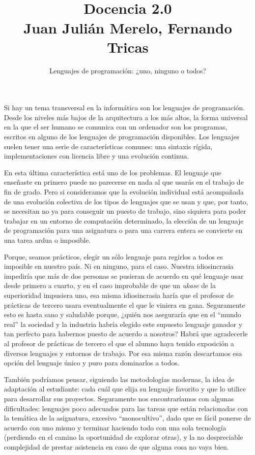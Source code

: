 \documentclass[twoside,10pt]{article}
\title{\ \\ Docencia 2.0\\ \large Juan Julián Merelo, Fernando Tricas}
\author{\LARGE Lenguajes de programación: ¿uno, ninguno o todos?}
\date{}
\newcounter{vol}
\begin{document}
\addtocounter{page}{2}

\maketitle

\vspace*{-5ex}

\begin{multicols}{2}

Si hay un tema transversal en la informática son los lenguajes de
programación. Desde los niveles más bajos de la arquitectura a los más
altos, la forma universal en la que el ser humano se comunica con un
ordenador son los programas, escritos en alguno de los lenguajes de
programación disponibles. Los lenguajes suelen tener una serie de
características comunes: una sintaxis rígida, implementaciones con
licencia libre y una evolución continua.

En esta última característica está uno de los problemas. El lenguaje
que enseñaste en primero puede no parecerse en nada al que usarás en
el trabajo de fin de grado. Pero si consideramos que la evolución
individual está acompañada de una evolución colectiva de los tipos de
lenguajes que se usan y que, por tanto, se necesitan no ya para
conseguir un puesto de trabajo, sino siquiera para poder trabajar en
un entorno de computación determinado, la elección de un lenguaje de
programación para una asignatura o para una carrera entera se convierte en
una tarea ardua o imposible.

Porque, seamos prácticos, elegir un sólo lenguaje para regirlos a
todos es imposible en nuestro país. Ni en ninguno, para el caso.
Nuestra idiosincrasia impediría que más de dos personas se pusieran de
acuerdo en qué lenguaje usar desde primero a cuarto, y en el caso
improbable de que un \emph{ukase} de la superioridad impusiera uno, esa
misma idiosincrasia haría que el profesor de prácticas de tercero usara
eventualmente el que le viniera en gana. 
Seguramente esto es hasta sano y saludable porque, ¿quién nos aseguraría
que en el ``mundo real'' la sociedad y la industria habría elegido este
supuesto lenguaje ganador y tan perfecto para habernos puesto de acuerdo a
nosotros? Habrá que agradecerle al profesor de prácticas de tercero el que
el alumno  haya tenido exposición a diversos lenguajes y
entornos de trabajo. Por esa misma razón descartamos esa opción
del lenguaje único y puro para dominarlos a todos.

También podríamos pensar, siguiendo las metodologías modernas, la idea de
adaptación al estudiante: cada cuál que elija su lenguaje favorito y que lo
utilice
para desarrollar sus proyectos. Seguramente nos encontraríamos con algunas
dificultades: lenguajes poco adecuados para las tareas que están
relacionadas con la temática de la asignatura, excesivo 
``monocultivo'',
dado que es fácil ponerse de acuerdo con uno mismo y terminar haciendo todo
con una sola tecnología (perdiendo en el camino la oportunidad de
explorar otras), y la
no despreciable complejidad de prestar asistencia en caso de que alguna cosa no
vaya bien. 


\end{multicols}
\end{document}
